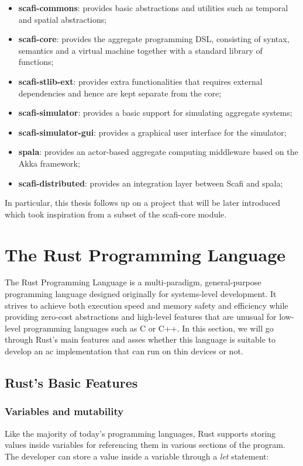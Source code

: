 \begin{itemize}
    \item \textbf{scafi-commons}: provides basic abstractions and utilities such as temporal and spatial abstractions;
    \item \textbf{scafi-core}: provides the aggregate programming DSL, consisting of syntax, semantics and a virtual machine together with a standard library of functions;
    \item \textbf{scafi-stlib-ext}: provides extra functionalities that requires external dependencies and hence are kept separate from the core;
    \item \textbf{scafi-simulator}: provides a basic support for simulating aggregate systems;
    \item \textbf{scafi-simulator-gui}: provides a graphical user interface for the simulator;
    \item \textbf{spala}: provides an actor-based aggregate computing middleware based on the Akka framework;
    \item \textbf{scafi-distributed}: provides an integration layer between Scafi and spala;
\end{itemize}

In particular, this thesis follows up on a project that will be later introduced which took inspiration from a subset of the scafi-core module.

\section{The Rust Programming Language}
The Rust Programming Language\cite{002} is a multi-paradigm, general-purpose programming language designed originally for systems-level development. It strives to achieve both execution
speed and memory safety and efficiency while providing zero-cost abstractions and high-level features that are unusual for low-level programming languages such as C or C++.
In this section, we will go through Rust's main features and asses whether this language is suitable to develop an \acs{ac} implementation that can run on thin devices or not.

\subsection{Rust's Basic Features}
\subsubsection{Variables and mutability}
Like the majority of today's programming languages, Rust supports storing values inside variables for referencing them in various sections of the program. \\
The developer can store a value inside a variable through a \textit{let} statement:

